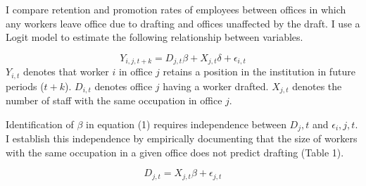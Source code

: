 \item I compare retention and promotion rates of employees between offices in which any workers leave office due to drafting and offices unaffected by the draft. I use a Logit model to estimate the following relationship between variables.

\begin{equation}
    Y_{i,j,t+k}=D_{j,t}\beta + X_{j,t}\delta +\epsilon_{i,t}
\end{equation}
$Y_{i,t}$ denotes that worker $i$ in office $j$ retains a position in the institution in future periods ($t+k$). $D_{i,t}$ denotes office $j$ having a worker drafted. $X_{j,t}$ denotes the number of staff with the same occupation in office $j$.

\item Identification of $\beta$ in equation (1) requires independence between $ D_j, t$ and $\epsilon_i, j, t$. I establish this independence by empirically documenting that the size of workers with the same occupation in a given office does not predict drafting (Table 1).

\begin{equation*}
    D_{j,t}=X_{j,t}\beta +\epsilon_{j,t}
\end{equation*}
\item 
